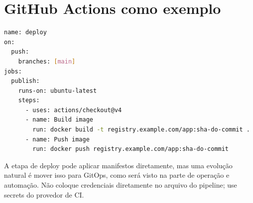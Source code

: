 \documentclass[11pt,a4paper]{article}
\begin{document}
\section*{\color{primary}GitHub Actions como exemplo}

\begin{lstlisting}[language=bash]
name: deploy
on:
  push:
    branches: [main]
jobs:
  publish:
    runs-on: ubuntu-latest
    steps:
      - uses: actions/checkout@v4
      - name: Build image
        run: docker build -t registry.example.com/app:sha-do-commit .
      - name: Push image
        run: docker push registry.example.com/app:sha-do-commit
\end{lstlisting}

A etapa de deploy pode aplicar manifestos diretamente, mas uma evolução natural é mover isso para GitOps, como será visto na parte de operação e automação. Não coloque credenciais diretamente no arquivo do pipeline; use secrets do provedor de CI.
\end{document}
